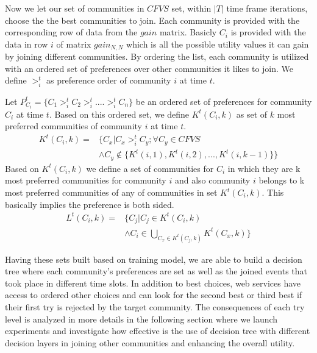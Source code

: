 \documentclass[10pt,journal,cspaper,compsoc]{IEEEtran}
\begin{document}
Now we let our set of communities in $CFVS$ set, within $|T|$ time frame iterations, choose the the best communities to join. Each community is provided with the corresponding row of data from the $gain$ matrix. Basicly $C_i$ is provided with the data in row $i$ of matrix $gain_{N,N}$ which is all the possible utility values it can gain by joining different communities. By ordering the list, each community is utilized with an ordered set of preferences over other communities it likes to join. We define $>_{i}^t$ as preference order of community $i$ at time $t$.

Let $P_{C_i}^t = \{C_1 >_{i}^t C_2 >_{i}^t .... >_{i}^t C_n\}$ be an ordered set of preferences for community $C_i$ at time $t$. Based on this ordered set, we define $K^t(C_i, k)$ as set of $k$ most preferred communities of community $i$ at time $t$.
\begin{equation}\label{h_t_pref_top}
\begin{split}				
K^t(C_i, k) = &\Big\{C_x | C_x >_{i}^t C_y; \forall C_y \in CFVS\ \\
				      &\wedge C_y \notin \{K^t(i, 1),K^t(i, 2),...,K^t(i, k-1)\} \Big\}				
\end{split}
\end{equation}
Based on $K^t(C_i, k)$ we define a set of communities for $C_i$ in which they are k most preferred communities for community $i$ and also community $i$ belongs to k most preferred communities of any of communities in set $K^t(C_i, k)$. This basically implies the preference is both sided.
\begin{equation}\label{l_t_top_both}
\begin{split}	
L^t(C_i,k) = &\Big\{C_j | C_j \in K^t(C_i, k) \\
             &\wedge C_i \in \bigcup_{C_x \in K^t(C_j, k)}K^t(C_x, k)\Big\}
\end{split}
\end{equation}

Having these sets built based on training model, we are able to build a decision tree where each community's preferences are set as well as the joined events that took place in different time slots. In addition to best choices, web services have access to ordered other choices and can look for the second best or third best if their first try is rejected by the target community. The consequences of each try level is analyzed in more details in the following section where we launch experiments and investigate how effective is the use of decision tree with different decision layers in joining other communities and enhancing the overall utility. 
\end{document}
